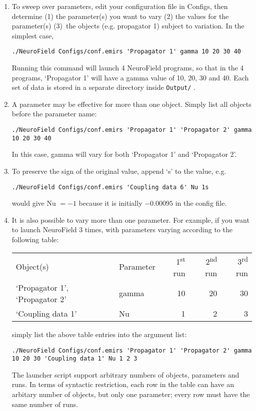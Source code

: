 \documentclass[12pt,a4paper]{article}
\newcommand{\type}[1]{ {\small\small\tt #1} }
\begin{document}
\begin{enumerate}
\begin{enumerate}
\item To sweep over parameters, edit your configuration file in Configs, then determine (1) the parameter(s) you want to vary (2) the values for the parameter(s) (3)~the objects (e.g. propagator 1) subject to variation. In the simplest case,
\begin{lstlisting}
./NeuroField Configs/conf.emirs 'Propagator 1' gamma 10 20 30 40
\end{lstlisting}
Running this command will launch 4 NeuroField programs, so that in the 4 programs, `Propagator 1' will have a gamma value of 10, 20, 30 and 40. Each set of data is stored in a separate directory inside \type{Output/}.

\item A parameter may be effective for more than one object. Simply list all objects before the parameter name:
\begin{lstlisting}
./NeuroField Configs/conf.emirs 'Propagator 1' 'Propagator 2' gamma 10 20 30 40
\end{lstlisting}
In this case, gamma will vary for both `Propagator 1' and `Propagator 2'.

\item To preserve the sign of the original value, append `s' to the value, e.g.
\begin{lstlisting}
./NeuroField Configs/conf.emirs 'Coupling data 6' Nu 1s
\end{lstlisting}
would give Nu $=-1$ because it is initially $-0.00095$ in the config file.

\item It is also possible to vary more than one parameter. For example, if you want to launch NeuroField 3 times, with parameters varying according to the following table:

\begin{tabular}{l l r r r}
Object(s)&Parameter&1\textsuperscript{st} run&2\textsuperscript{nd} run&3\textsuperscript{rd} run\\
`Propagator 1', `Propagator 2'&gamma&10&20&30\\
`Coupling data 1'&Nu&1&2&3
\end{tabular}

simply list the above table entries into the argument list:
\begin{lstlisting}
./NeuroField Configs/conf.emirs 'Propagator 1' 'Propagator 2' gamma 10 20 30 'Coupling data 1' Nu 1 2 3
\end{lstlisting}
The launcher script support arbitrary numbers of objects, parameters and runs. In terms of syntactic restriction, each row in the table can have an arbitary number of objects, but only one parameter; every row must have the same number of runs.


\end{enumerate}
\end{enumerate}
\end{document}
